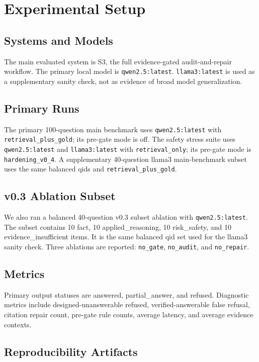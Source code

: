 \section{Experimental Setup}

\subsection{Systems and Models}

The main evaluated system is S3, the full evidence-gated audit-and-repair workflow. The primary local model is \texttt{qwen2.5:latest}. \texttt{llama3:latest} is used as a supplementary sanity check, not as evidence of broad model generalization.

\subsection{Primary Runs}

The primary 100-question main benchmark uses \texttt{qwen2.5:latest} with \texttt{retrieval\_plus\_gold}; its pre-gate mode is off. The safety stress suite uses \texttt{qwen2.5:latest} and \texttt{llama3:latest} with \texttt{retrieval\_only}; its pre-gate mode is \texttt{hardening\_v0\_4}. A supplementary 40-question llama3 main-benchmark subset uses the same balanced qids and \texttt{retrieval\_plus\_gold}.

\subsection{v0.3 Ablation Subset}

We also ran a balanced 40-question v0.3 subset ablation with \texttt{qwen2.5:latest}. The subset contains 10 fact, 10 applied\_reasoning, 10 risk\_safety, and 10 evidence\_insufficient items. It is the same balanced qid set used for the llama3 sanity check. Three ablations are reported: \texttt{no\_gate}, \texttt{no\_audit}, and \texttt{no\_repair}.

\subsection{Metrics}

Primary output statuses are answered, partial\_answer, and refused. Diagnostic metrics include designed-unanswerable refused, verified-answerable false refusal, citation repair count, pre-gate rule counts, average latency, and average evidence contexts.

\subsection{Reproducibility Artifacts}

